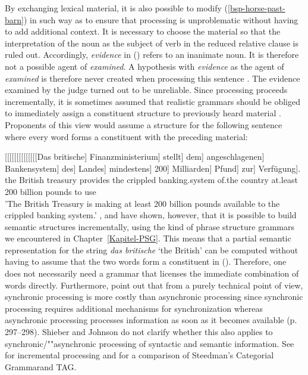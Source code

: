\noindent
By exchanging lexical material, it is also possible to modify (\ref{bsp-horse-past-barn}) in such way as to
ensure that processing is unproblematic without having to add additional context. It is necessary
to choose the material so that the interpretation of the noun as the subject of verb in the reduced
relative clause is ruled out. Accordingly, \emph{evidence} in () refers to an inanimate noun.
It is therefore not a possible agent of \emph{examined}. A hypothesis with \emph{evidence} as the
agent of \emph{examined} is therefore never created when processing this sentence
\citep{SW2011a}.
\ea
The evidence examined by the judge turned out to be unreliable.
\z
Since processing proceeds incrementally, it is sometimes assumed that realistic grammars should be obliged to immediately assign a constituent structure to previously heard
material \citep{AS82a,Hausser92a-u}.
Proponents of this view would assume a structure for the following sentence where every word forms a constituent with the
preceding material:

\ea
\gll {}[[[[[[[[[[[[[[Das britische] Finanzministerium] stellt] dem] angeschlagenen] Bankensystem] des] Landes] mindestens] 200] Milliarden] Pfund] zur] Verfügung].\\
{}\spacebr{}\spacebr{}\spacebr{}\spacebr{}\spacebr{}\spacebr{}\spacebr{}\spacebr{}\spacebr{}\spacebr{}\spacebr{}\spacebr{}\spacebr{}\spacebr{}the British treasury provides the
crippled banking.system of.the country at.least 200 billion pounds to use\\
\glt 'The British Treasury is making at least 200 billion pounds available to the crippled banking system.'
\z
\citet{Pulman85a}, \citet{Stabler91a} and \citet[--308]{SJ93a} have shown, however, that it is possible to build semantic structures incrementally,
using the kind of phrase structure grammars we encountered in Chapter~\ref{Kapitel-PSG}. This means that a partial semantic representation for the
string \emph{das britische} `the British' can be computed without having to assume that the two words form a constituent in ().
Therefore, one does not necessarily need a grammar that licenses the immediate combination of words directly.
Furthermore,  point out that from a purely technical point of view, synchronic processing is more costly than asynchronic processing since
synchronic processing requires additional mechanisms for synchronization whereas asynchronic processing processes information as soon as it
becomes available (p.\,297--298). Shieber and Johnson do not clarify whether this also applies to synchronic/""asynchronic processing of syntactic and semantic
information. See  for incremental processing and for a comparison of Steedman's Categorial Grammar\indexcg and TAG\indextag.

